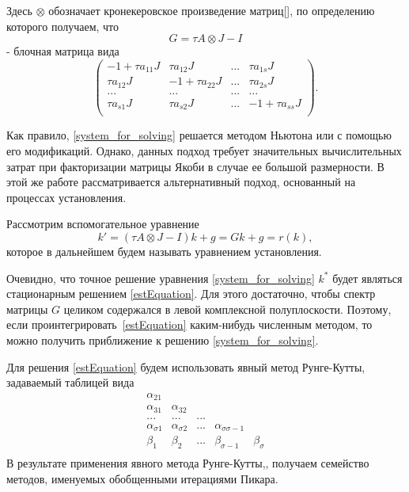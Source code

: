 \documentclass[a4paper,14pt]{extreport}
\begin{document}
Здесь $\otimes$ обозначает кронекеровское произведение матриц[], по
определению которого получаем, что $$G=\tau A\otimes J-I$$ - блочная
матрица вида
	\begin{equation}
	\left(
	\begin{array}{llll}
	-1+\tau a_{11}J& \tau a_{12}J&...&\tau a_{1s}J\\
 	\tau a_{12}J&-1+\tau a_{22}J&...&\tau a_{2s}J\\
	...&...&...&...\\
	\tau a_{s1}J& \tau a_{s2}J&...&-1+\tau a_{ss}J\\
	\end{array}
	\right ).
	\end{equation}
	
Как правило, \eqref{system_for_solving} решается методом Ньютона или с помощью его модификаций. Однако, данных подход требует значительных вычислительных затрат при факторизации матрицы Якоби в случае ее большой размерности. В этой же работе рассматривается альтернативный подход, основанный на процессах установления\cite{Bondar_Faleichik_Parall}.
	
 
Рассмотрим вспомогательное уравнение
	\begin{equation}
	\label{estEquation}
	k'=(\tau A\otimes J-I)k+g=Gk+g = r(k),
	\end{equation}
которое в дальнейшем будем называть уравнением установления.

Очевидно, что точное решение уравнения \eqref{system_for_solving} $k^*$ будет являться стационарным решением \eqref{estEquation}. Для этого достаточно, чтобы спектр матрицы $G$ целиком содержался в левой комплексной полуплоскости. Поэтому, если проинтегрировать~\eqref{estEquation}  каким-нибудь численным методом, то можно получить приближение к решению \eqref{system_for_solving}.

Для решения \eqref{estEquation} будем использовать явный метод Рунге-Кутты, задаваемый таблицей вида
	\begin{equation}
	\label{auxilary_method_table}
	\begin{array}{lllll}
	 \alpha_{21}& & & &  \\
	 \alpha_{31}&\alpha_{32} & & &  \\
	 ...& ...& ...& &\\
	 \alpha_{\sigma1}& \alpha_{\sigma2}&... &\alpha_{\sigma\sigma-1}&  \\
	\hline
	 \beta_1&\beta_2 &...&\beta_{\sigma-1}& \beta_\sigma\\
	\end{array}
	\end{equation}
В результате применения явного метода Рунге-Кутты,, получаем семейство методов, именуемых обобщенными итерациями Пикара. 
	
\end{document}
